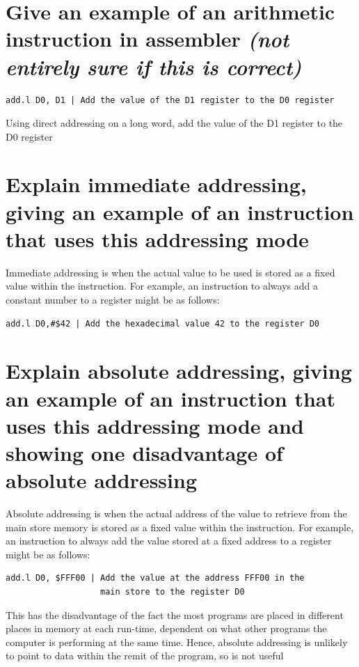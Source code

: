 \documentclass{article}
\begin{document}
\section{Give an example of an arithmetic instruction in assembler \emph{(not
entirely sure if this is correct)}}
\begin{verbatim}
add.l D0, D1 | Add the value of the D1 register to the D0 register
\end{verbatim}
Using direct addressing on a long word, add the value of the D1 register to the
D0 register



\section{Explain immediate addressing, giving an example of an instruction that
uses this addressing mode}

Immediate addressing is when the actual value to be used is stored as a fixed
value within the instruction. For example, an instruction to always add a
constant number to a register might be as follows:

\begin{verbatim}
add.l D0,#$42 | Add the hexadecimal value 42 to the register D0
\end{verbatim}



\section{Explain absolute addressing, giving an example of an instruction that
uses this addressing mode and showing one disadvantage of absolute addressing}

Absolute addressing is when the actual address of the value to retrieve from the
main store memory is stored as a fixed value within the instruction. For
example, an instruction to always add the value stored at a fixed address to a
register might be as follows:

\begin{verbatim}
add.l D0, $FFF00 | Add the value at the address FFF00 in the
                   main store to the register D0
\end{verbatim}

This has the disadvantage of the fact the most programs are placed in different
places in memory at each run-time, dependent on what other programs the computer
is performing at the same time. Hence, absolute addressing is unlikely to point
to data within the remit of the program, so is not useful
\end{document}
